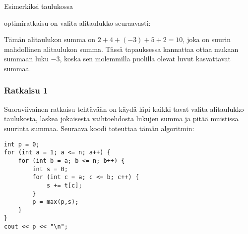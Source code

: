 Esimerkiksi taulukossa
\begin{center}
\end{center}
optimiratkaisu on valita alitaulukko seuraavasti:
\begin{center}
\end{center}

Tämän alitaulukon summa on $2+4+(-3)+5+2=10$,
joka on suurin mahdollinen alitaulukon summa.
Tässä tapauksessa kannattaa ottaa mukaan summaan
luku $-3$, koska sen molemmilla puolilla
olevat luvut kasvattavat summaa.

\subsubsection{Ratkaisu 1}

Suoraviivainen ratkaisu tehtävään on käydä
läpi kaikki tavat valita alitaulukko taulukosta,
laskea jokaisesta vaihtoehdosta lukujen summa
ja pitää muistissa suurinta summaa.
Seuraava koodi toteuttaa tämän algoritmin:

\begin{lstlisting}
int p = 0;
for (int a = 1; a <= n; a++) {
    for (int b = a; b <= n; b++) {
        int s = 0;
        for (int c = a; c <= b; c++) {
            s += t[c];
        }
        p = max(p,s);
    }
}
cout << p << "\n";
\end{lstlisting}

